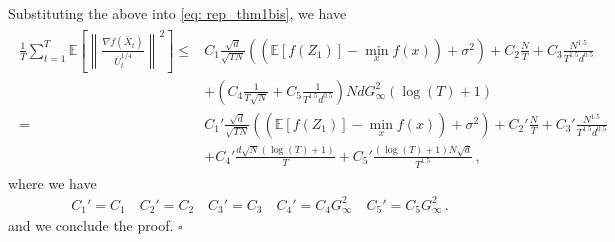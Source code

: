 \documentclass[11pt]{article}
\begin{document}
Substituting the above into \eqref{eq: rep_thm1bis}, we have 
\begin{align}\label{eq: sub_thm1bis}
\begin{split}
	 \frac{1}{T}\sum_{t=1}^T  \mathbb E \left [\left\|\frac{\nabla f( \overline X_{t})}{\overline U_{t}^{1/4}}\right\|^2  \right] 
	\leq  & C_1 \frac{\sqrt{d}}{\sqrt{TN}} \left(( \mathbb E  [f( Z_{1})]  -  \min_x  f(x)) +    \sigma^2 \right)  +  C_2 \frac{N}{T}  +  C_3 \frac{N^{1.5}}{T^{1.5}d^{0.5}} 
	\nonumber \\
    &+  \left(C_4 \frac{1}{T\sqrt{N}} +  C_5   \frac{1}{T^{1.5}d^{0.5}}\right) 
NdG_{\infty}^2 (\log(T)+1)\\
	=  & C_1' \frac{\sqrt{d}}{\sqrt{TN}} \left(( \mathbb E  [f( Z_{1})]  -  \min_x  f(x)) +    \sigma^2 \right)  +  C_2' \frac{N}{T}  +  C_3' \frac{N^{1.5}}{T^{1.5}d^{0.5}} 
	\nonumber \\
    &+  C_4' \frac{d\sqrt{N}(\log(T)+1)}{T} +  C_5'   \frac{(\log(T)+1)N\sqrt{d}}{T^{1.5}}\,,
\end{split}
\end{align}
where we have 
\begin{align}
C_1' = C_1 \quad C_2' = C_2 \quad C_3' = C_3 \quad C_4' = C_4G_{\infty}^2 \quad C_5' = C_5 G_{\infty}^2 \, .
\end{align}
and we conclude the proof. \hfill $\square$
\end{document}
